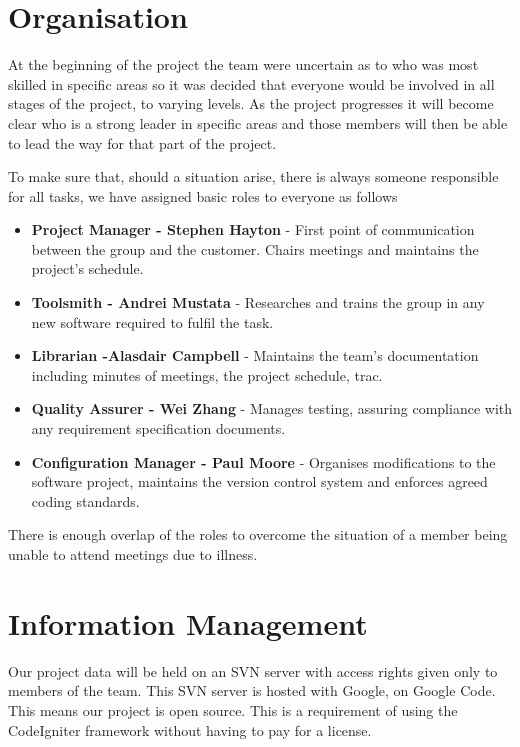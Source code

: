 \documentclass{l3proj}
\begin{document}
\newpage
\section{Organisation}
\label{sect:org}
At the beginning of the project the team were uncertain as to who was most skilled in specific areas so it was decided that everyone would be involved in all stages of the project, to varying levels. As the project progresses it will become clear who is a strong leader in specific areas and those members will then be able to lead the way for that part of the project.

To make sure that, should a situation arise, there is always someone responsible for all tasks, we have assigned basic roles to everyone as follows

\begin{itemize}
\item{\textbf{Project Manager - Stephen Hayton} - First point of communication between the group and the customer. Chairs meetings and maintains the project’s schedule.}
\item{\textbf{Toolsmith - Andrei Mustata} - Researches and trains the group in any new software required to fulfil the task.}
\item{\textbf{Librarian -Alasdair Campbell} - Maintains the team’s documentation including minutes of meetings, the project schedule, trac.}
\item{\textbf{Quality Assurer - Wei Zhang} - Manages testing, assuring compliance with any requirement specification documents.}
\item{\textbf{Configuration Manager - Paul Moore} - Organises modifications to the software project, maintains the version control system and enforces agreed coding standards.}
\end{itemize}

There is enough overlap of the roles to overcome the situation of a member being unable to attend
meetings due to illness.

\section{Information Management}
\label{sect:info-man}
Our project data will be held on an SVN server with access rights given only to
members of the team. This SVN server is hosted with Google, on Google Code. This
means our project is open source. This is a requirement of using the CodeIgniter
framework without having to pay for a license. 
\end{document}
